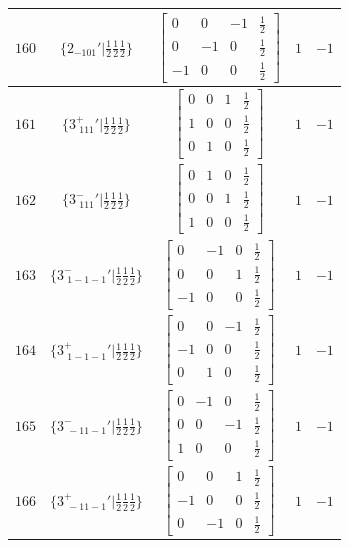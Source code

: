 \documentclass[fleqn,8pt]{jsarticle}
\begin{document}
\begin{longtable}{ccccc}
$ 160 $ & $ \{2{}_{-101}{}'|\frac{1}{2} \frac{1}{2} \frac{1}{2}\} $ & $ \begin{bmatrix} 0 & 0 & -1 & \frac{1}{2} \\ 0 & -1 & 0 & \frac{1}{2} \\ -1 & 0 & 0 & \frac{1}{2} \end{bmatrix} $ & $ 1 $ & $ -1 $ \\ \hline
$ 161 $ & $ \{3^{+}_{\,\,111}{}'|\frac{1}{2} \frac{1}{2} \frac{1}{2}\} $ & $ \begin{bmatrix} 0 & 0 & 1 & \frac{1}{2} \\ 1 & 0 & 0 & \frac{1}{2} \\ 0 & 1 & 0 & \frac{1}{2} \end{bmatrix} $ & $ 1 $ & $ -1 $ \\ \hline
$ 162 $ & $ \{3^{-}_{\,\,111}{}'|\frac{1}{2} \frac{1}{2} \frac{1}{2}\} $ & $ \begin{bmatrix} 0 & 1 & 0 & \frac{1}{2} \\ 0 & 0 & 1 & \frac{1}{2} \\ 1 & 0 & 0 & \frac{1}{2} \end{bmatrix} $ & $ 1 $ & $ -1 $ \\ \hline
$ 163 $ & $ \{3^{-}_{\,\,1-1-1}{}'|\frac{1}{2} \frac{1}{2} \frac{1}{2}\} $ & $ \begin{bmatrix} 0 & -1 & 0 & \frac{1}{2} \\ 0 & 0 & 1 & \frac{1}{2} \\ -1 & 0 & 0 & \frac{1}{2} \end{bmatrix} $ & $ 1 $ & $ -1 $ \\ \hline
$ 164 $ & $ \{3^{+}_{\,\,1-1-1}{}'|\frac{1}{2} \frac{1}{2} \frac{1}{2}\} $ & $ \begin{bmatrix} 0 & 0 & -1 & \frac{1}{2} \\ -1 & 0 & 0 & \frac{1}{2} \\ 0 & 1 & 0 & \frac{1}{2} \end{bmatrix} $ & $ 1 $ & $ -1 $ \\ \hline
$ 165 $ & $ \{3^{-}_{\,\,-11-1}{}'|\frac{1}{2} \frac{1}{2} \frac{1}{2}\} $ & $ \begin{bmatrix} 0 & -1 & 0 & \frac{1}{2} \\ 0 & 0 & -1 & \frac{1}{2} \\ 1 & 0 & 0 & \frac{1}{2} \end{bmatrix} $ & $ 1 $ & $ -1 $ \\ \hline
$ 166 $ & $ \{3^{+}_{\,\,-11-1}{}'|\frac{1}{2} \frac{1}{2} \frac{1}{2}\} $ & $ \begin{bmatrix} 0 & 0 & 1 & \frac{1}{2} \\ -1 & 0 & 0 & \frac{1}{2} \\ 0 & -1 & 0 & \frac{1}{2} \end{bmatrix} $ & $ 1 $ & $ -1 $ \\ \hline

\end{longtable}
\end{document}
